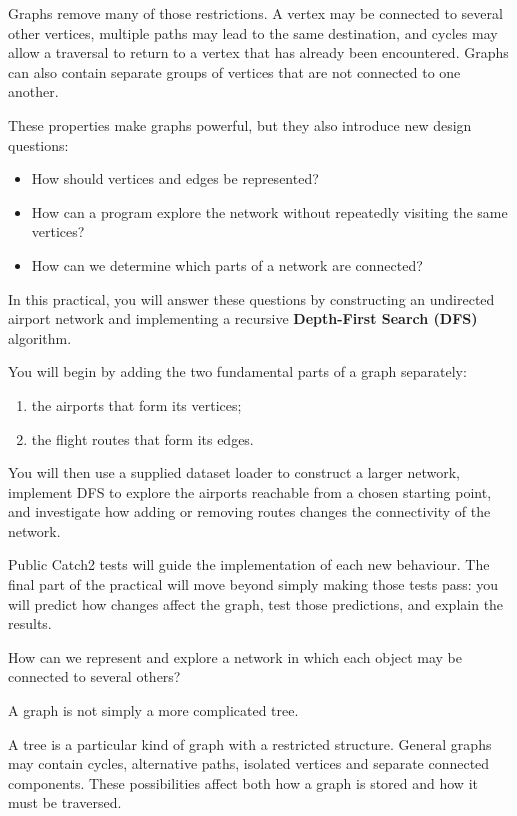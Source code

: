 \documentclass{csc2059practical}
\begin{document}
Graphs remove many of those restrictions. A vertex may be connected to several
other vertices, multiple paths may lead to the same destination, and cycles may
allow a traversal to return to a vertex that has already been encountered.
Graphs can also contain separate groups of vertices that are not connected to
one another.

These properties make graphs powerful, but they also introduce new design
questions:

\begin{itemize}
\item How should vertices and edges be represented?
\item How can a program explore the network without repeatedly visiting the
same vertices?
\item How can we determine which parts of a network are connected?
\end{itemize}

In this practical, you will answer these questions by constructing an undirected
airport network and implementing a recursive \textbf{Depth-First Search (DFS)}
algorithm.

You will begin by adding the two fundamental parts of a graph separately:

\begin{enumerate}
\item the airports that form its vertices;
\item the flight routes that form its edges.
\end{enumerate}

You will then use a supplied dataset loader to construct a larger network,
implement DFS to explore the airports reachable from a chosen starting point,
and investigate how adding or removing routes changes the connectivity of the
network.

Public Catch2 tests will guide the implementation of each new behaviour. The
final part of the practical will move beyond simply making those tests pass:
you will predict how changes affect the graph, test those predictions, and
explain the results.

\begin{engineeringquestion}
How can we represent and explore a network in which each object may be connected
to several others?
\end{engineeringquestion}

\begin{importantnote}
A graph is not simply a more complicated tree.

A tree is a particular kind of graph with a restricted structure. General
graphs may contain cycles, alternative paths, isolated vertices and separate
connected components. These possibilities affect both how a graph is stored and
how it must be traversed.
\end{importantnote}
\end{document}

